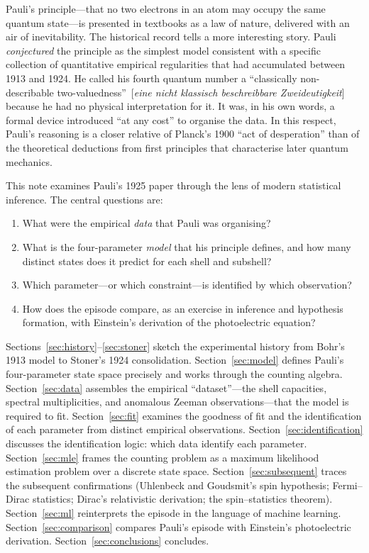 \documentclass[12pt]{article}
\begin{document}
Pauli's principle---that no two electrons in an atom may occupy the same
quantum state---is presented in textbooks as a law of nature, delivered with
an air of inevitability.  The historical record tells a more interesting story.
Pauli \emph{conjectured} the principle as the simplest model consistent with a
specific collection of quantitative empirical regularities that had accumulated
between 1913 and 1924.  He called his fourth quantum number a
``classically non-describable two-valuedness''~[\textit{eine nicht klassisch
beschreibbare Zweideutigkeit}] because he had no physical interpretation for
it.  It was, in his own words, a formal device introduced ``at any cost'' to
organise the data.  In this respect, Pauli's reasoning is a closer relative of
Planck's 1900 ``act of desperation'' than of the theoretical deductions from
first principles that characterise later quantum mechanics.

This note examines Pauli's 1925 paper through the lens of modern statistical
inference.  The central questions are:
\begin{enumerate}
  \item What were the empirical \emph{data} that Pauli was organising?
  \item What is the four-parameter \emph{model} that his principle defines,
    and how many distinct states does it predict for each shell and subshell?
  \item Which parameter---or which constraint---is identified by which
    observation?
  \item How does the episode compare, as an exercise in inference and
    hypothesis formation, with Einstein's derivation of the photoelectric
    equation?
\end{enumerate}
Sections~\ref{sec:history}--\ref{sec:stoner} sketch the experimental history
from Bohr's 1913 model to Stoner's 1924 consolidation.
Section~\ref{sec:model} defines Pauli's four-parameter state space precisely
and works through the counting algebra.
Section~\ref{sec:data} assembles the empirical ``dataset''---the shell
capacities, spectral multiplicities, and anomalous Zeeman observations---that
the model is required to fit.
Section~\ref{sec:fit} examines the goodness of fit and the identification of
each parameter from distinct empirical observations.
Section~\ref{sec:identification} discusses the identification logic: which
data identify each parameter.
Section~\ref{sec:mle} frames the counting problem as a maximum likelihood
estimation problem over a discrete state space.
Section~\ref{sec:subsequent} traces the subsequent confirmations (Uhlenbeck and
Goudsmit's spin hypothesis; Fermi--Dirac statistics; Dirac's relativistic
derivation; the spin--statistics theorem).
Section~\ref{sec:ml} reinterprets the episode in the language of machine
learning.
Section~\ref{sec:comparison} compares Pauli's episode with Einstein's
photoelectric derivation.
Section~\ref{sec:conclusions} concludes.
\end{document}
